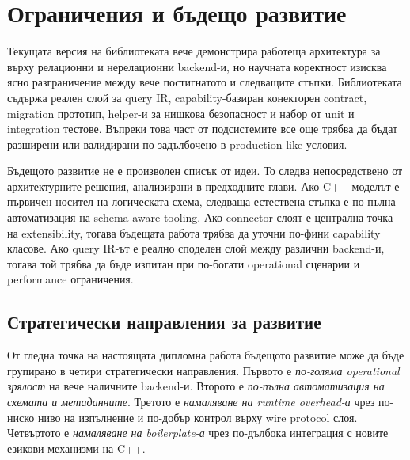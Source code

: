 \section{Ограничения и бъдещо развитие}
\label{sec:future_work}

Текущата версия на библиотеката вече демонстрира работеща архитектура за \ORMName{} върху релационни и нерелационни backend-и, но научната коректност изисква ясно разграничение между вече постигнатото и следващите стъпки. Библиотеката съдържа реален слой за query IR, capability-базиран конекторен contract, migration прототип, helper-и за нишкова безопасност и набор от unit и integration тестове. Въпреки това част от подсистемите все още трябва да бъдат разширени или валидирани по-задълбочено в production-like условия.

Бъдещото развитие не е произволен списък от идеи. То следва непосредствено от архитектурните решения, анализирани в предходните глави. Ако C++ моделът е първичен носител на логическата схема, следваща естествена стъпка е по-пълна автоматизация на schema-aware tooling. Ако connector слоят е централна точка на extensibility, тогава бъдещата работа трябва да уточни по-фини capability класове. Ако query IR-ът е реално споделен слой между различни backend-и, тогава той трябва да бъде изпитан при по-богати operational сценарии и performance ограничения.

\subsection{Стратегически направления за развитие}

От гледна точка на настоящата дипломна работа бъдещото развитие може да бъде групирано в четири стратегически направления. Първото е \emph{по-голяма operational зрялост} на вече наличните backend-и. Второто е \emph{по-пълна автоматизация на схемата и метаданните}. Третото е \emph{намаляване на runtime overhead-а} чрез по-ниско ниво на изпълнение и по-добър контрол върху wire protocol слоя. Четвъртото е \emph{намаляване на boilerplate-а} чрез по-дълбока интеграция с новите езикови механизми на C++.

